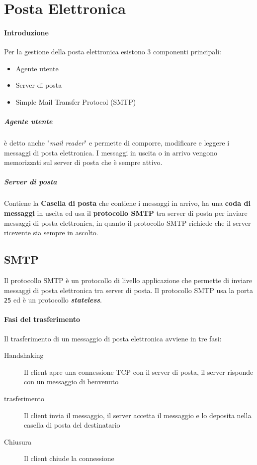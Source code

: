 \section{Posta Elettronica}
    \paragraph{Introduzione}
        Per la gestione della posta elettronica esistono 3 componenti principali:
        \begin{itemize}
            \item Agente utente
            \item Server di posta
            \item Simple Mail Transfer Protocol (\Acrshort*{SMTP})
        \end{itemize}
        \subparagraph{Agente utente} è detto anche "\textit{mail reader}" e permette di comporre, modificare e leggere i messaggi di posta elettronica. I messaggi in uscita o in arrivo vengono memorizzati sul server di posta che è sempre attivo.
        \subparagraph{Server di posta} Contiene la \textbf{Casella di posta} che contiene i messaggi in arrivo, ha una \textbf{coda di messaggi} in uscita ed usa il \textbf{protocollo \Acrshort*{SMTP}} tra server di posta per inviare messaggi di posta elettronica, in quanto il protocollo \Acrshort*{SMTP} richiede che il server ricevente sia sempre in ascolto.
    \subsection[Simple Mail Transfer Protocol (\texttt{SMTP})]{\Acrfull*{SMTP}}
        Il protocollo \acrfull*{SMTP} è un protocollo di livello applicazione che permette di inviare messaggi di posta elettronica tra server di posta. Il protocollo \Acrshort*{SMTP} usa la porta \texttt{25} ed è un protocollo \textit{\textbf{stateless}}.
        \paragraph{Fasi del trasferimento} Il trasferimento di un messaggio di posta elettronica avviene in tre fasi:
            \begin{description}
                \item[Handshaking] Il client apre una connessione \Acrshort*{TCP} con il server di posta, il server risponde con un messaggio di benvenuto
                \item[trasferimento] Il client invia il messaggio, il server accetta il messaggio e lo deposita nella casella di posta del destinatario
                \item[Chiusura] Il client chiude la connessione
            \end{description}
